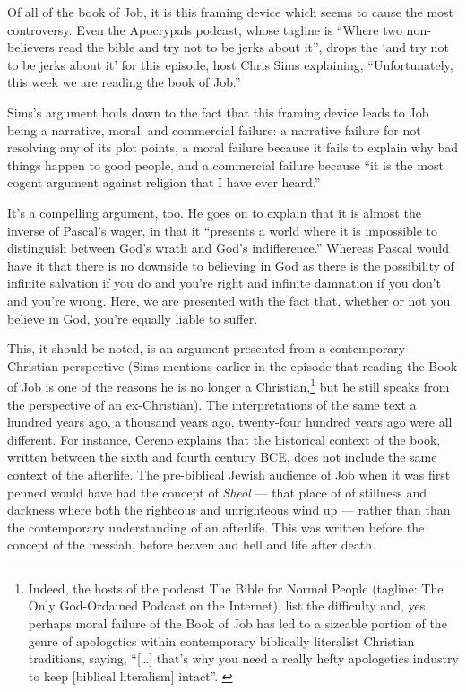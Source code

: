 Of all of the book of Job, it is this framing device which seems to cause the most controversy. Even the Apocrypals podcast, whose tagline is ``Where two non-believers read the bible and try not to be jerks about it'', drops the `and try not to be jerks about it' for this episode, host Chris Sims explaining, ``Unfortunately, this week we are reading the book of Job.'' \parencite{apocrypals}

Sims's argument boils down to the fact that this framing device leads to Job being a narrative, moral, and commercial failure: a narrative failure for not resolving any of its plot points, a moral failure because it fails to explain why bad things happen to good people, and a commercial failure because ``it is the most cogent argument against religion that I have ever heard.''

It's a compelling argument, too. He goes on to explain that it is almost the inverse of Pascal's wager, in that it ``presents a world where it is impossible to distinguish between God's wrath and God's indifference.'' Whereas Pascal would have it that there is no downside to believing in God as there is the possibility of infinite salvation if you do and you're right and infinite damnation if you don't and you're wrong. Here, we are presented with the fact that, whether or not you believe in God, you're equally liable to suffer.

This, it should be noted, is an argument presented from a contemporary Christian perspective (Sims mentions earlier in the episode that reading the Book of Job is one of the reasons he is no longer a Christian,\footnote{Indeed, the hosts of the podcast The Bible for Normal People (tagline: The Only God-Ordained Podcast on the Internet), list the difficulty and, yes, perhaps moral failure of the Book of Job has led to a sizeable portion of the genre of apologetics within contemporary biblically literalist Christian traditions, saying, ``{[}\ldots{]} that's why you need a really hefty apologetics industry to keep {[}biblical literalism{]} intact''. \parencite{b4np}} but he still speaks from the perspective of an ex-Christian). The interpretations of the same text a hundred years ago, a thousand years ago, twenty-four hundred years ago were all different. For instance, Cereno explains that the historical context of the book, written between the sixth and fourth century BCE, does not include the same context of the afterlife. The pre-biblical Jewish audience of Job when it was first penned would have had the concept of \emph{Sheol} --- that place of of stillness and darkness where both the righteous and unrighteous wind up --- rather than than the contemporary understanding of an afterlife. This was written before the concept of the messiah, before heaven and hell and life after death.


